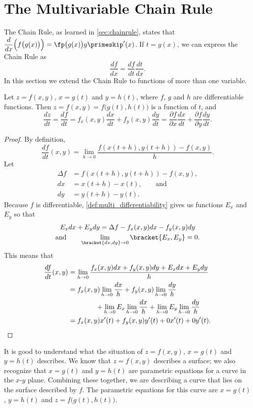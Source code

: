 \section{The Multivariable Chain Rule}\label{sec:multi_chain}

The Chain Rule, as learned in \autoref{sec:chainrule}, states that $\dfrac{d}{dx}\Big(f\big(g(x)\big)\Big) = \fp\big(g(x)\big)g\primeskip'(x)$. If $t=g(x)$, we can express the Chain Rule as 
$$\frac{df}{dx} = \frac{df}{dt}\frac{dt}{dx}.$$
In this section we extend the Chain Rule to functions of more than one variable.

{Let $z=f(x,y)$, $x=g(t)$ and $y=h(t)$, where $f$, $g$ and $h$ are differentiable functions. Then $z = f(x,y) = f\big(g(t),h(t)\big)$ is a function of $t$, and 
\[
	\frac{dz}{dt} = \frac{df}{dt}
	= f_x(x,y)\frac{dx}{dt}+f_y(x,y)\frac{dy}{dt}
	= \frac{\partial f}{\partial x}\frac{dx}{dt}
	+\frac{\partial f}{\partial y}\frac{dy}{dt}.
\]}

\begin{proof}
By definition,
\[\frac{df}{dt}(x,y)=\lim_{h\to0}\frac{f(x(t+h),y(t+h))-f(x,y)}h.\]
Let
\begin{align*}
 \Delta f&=f(x(t+h),y(t+h))-f(x,y), \\
 dx&=x(t+h)-x(t),\qquad\text{and} \\
 dy&=y(t+h)-y(t).
\end{align*}
Because $f$ is differentiable, \autoref{def:multi_differentiability} gives us functions $E_x$ and $E_y$ so that
\begin{gather*}
 E_x dx+E_y dy = \Delta f-f_x(x,y)dx-f_y(x,y)dy\\
 \text{and}\qquad
 \lim_{\bracket{dx,dy}\to0}\bracket{E_x,E_y}=0.
\end{gather*}
This means that
\begin{align*}
 \frac{df}{dt}(x,y)
 &=\lim_{h\to0}\frac{f_x(x,y)dx+f_y(x,y)dy+E_x dx+E_y dy}h \\
 &=f_x(x,y)\lim_{h\to0}\frac{dx}h+f_y(x,y)\lim_{h\to0}\frac{dy}h \\
 &\qquad\qquad\mbox{}
 +\lim_{h\to0}E_x\lim_{h\to0}\frac{dx}h+\lim_{h\to0}E_y\lim_{h\to0}\frac{dy}h \\
 &=f_x(x,y)x'(t)+f_y(x,y)y'(t)+0x'(t)+0y'(t).\qedhere
\end{align*}
\end{proof}

It is good to understand what the situation of $z=f(x,y)$, $x=g(t)$ and $y=h(t)$ describes. We know that $z=f(x,y)$ describes a surface; we also recognize that $x=g(t)$ and $y=h(t)$ are parametric equations for a curve in the $x$-$y$ plane. Combining these together, we are describing a curve that lies on the surface described by $f$. The parametric equations for this curve are $x=g(t)$, $y=h(t)$ and $z=f\big(g(t),h(t)\big)$.

